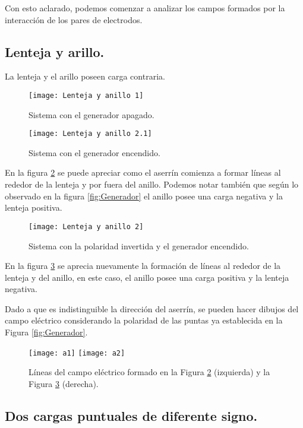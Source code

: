 \documentclass[14pt]{article}
\begin{document}
Con esto aclarado, podemos comenzar a analizar los campos formados por la interacción de los pares de electrodos.

\newpage
\subsection{Lenteja y arillo.}



La lenteja y el arillo poseen carga contraria.

\begin{figure}[h!]
	\centering
	\texttt{[image: Lenteja y anillo 1]}
	\caption{Sistema con el generador apagado.}
	\label{fig:AyLO}
\end{figure}


\begin{figure}[h!]
	\centering
	\texttt{[image: Lenteja y anillo 2.1]}
	\caption{Sistema con el generador encendido.}
	\label{fig:AyLE1}
\end{figure}

En la figura \ref{fig:AyLE1} se puede apreciar como el aserrín comienza a formar líneas al rededor de la lenteja y por fuera del anillo. Podemos notar también que según lo observado en la figura \ref{fig:Generador} el anillo posee una carga negativa y la lenteja positiva.

\newpage
\begin{figure}[h!]
	\centering
	\texttt{[image: Lenteja y anillo 2]}
	\caption{Sistema con la polaridad invertida y el generador encendido.}
	\label{fig:AyLE2}
\end{figure}

En la figura \ref{fig:AyLE2} se aprecia nuevamente la formación de líneas al rededor de la lenteja y del anillo, en este caso, el anillo posee una carga positiva y la lenteja negativa. 

Dado a que es indistinguible la dirección del aserrín, se pueden hacer dibujos del campo eléctrico considerando la polaridad de las puntas ya establecida en la Figura \ref{fig:Generador}.

\begin{figure}[h!]
	\centering
	\texttt{[image: a1]}
	\texttt{[image: a2]}
	\caption{Líneas del campo eléctrico formado en la Figura \ref{fig:AyLE1} (izquierda) y la Figura \ref{fig:AyLE2} (derecha).}
\end{figure}

\newpage
\subsection{Dos cargas puntuales de diferente signo.}
\end{document}
